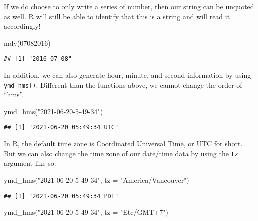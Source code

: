 \documentclass[
]{book}
\newenvironment{Shaded}{\begin{snugshade}}{\end{snugshade}}
\newcommand{\AttributeTok}[1]{\textcolor[rgb]{0.77,0.63,0.00}{#1}}
\newcommand{\DecValTok}[1]{\textcolor[rgb]{0.00,0.00,0.81}{#1}}
\newcommand{\FunctionTok}[1]{\textcolor[rgb]{0.00,0.00,0.00}{#1}}
\newcommand{\NormalTok}[1]{#1}
\newcommand{\StringTok}[1]{\textcolor[rgb]{0.31,0.60,0.02}{#1}}
\begin{document}
If we do choose to only write a series of number, then our string can be unquoted as well. R will still be able to identify that this is a string and will read it accordingly!

\begin{Shaded}
\begin{Highlighting}[]
\FunctionTok{mdy}\NormalTok{(}\DecValTok{07082016}\NormalTok{)}
\end{Highlighting}
\end{Shaded}

\begin{verbatim}
## [1] "2016-07-08"
\end{verbatim}

In addition, we can also generate hour, minute, and second information by using \texttt{ymd\_hms()}. Different than the functions above, we cannot change the order of ``hms''.

\begin{Shaded}
\begin{Highlighting}[]
\FunctionTok{ymd\_hms}\NormalTok{(}\StringTok{"2021{-}06{-}20{-}5{-}49{-}34"}\NormalTok{)}
\end{Highlighting}
\end{Shaded}

\begin{verbatim}
## [1] "2021-06-20 05:49:34 UTC"
\end{verbatim}

In R, the default time zone is Coordinated Universal Time, or UTC for short. But we can also change the time zone of our date/time data by using the \texttt{tz} argument like so:

\begin{Shaded}
\begin{Highlighting}[]
\FunctionTok{ymd\_hms}\NormalTok{(}\StringTok{"2021{-}06{-}20{-}5{-}49{-}34"}\NormalTok{, }\AttributeTok{tz =} \StringTok{"America/Vancouver"}\NormalTok{)}
\end{Highlighting}
\end{Shaded}

\begin{verbatim}
## [1] "2021-06-20 05:49:34 PDT"
\end{verbatim}

\begin{Shaded}
\begin{Highlighting}[]
\FunctionTok{ymd\_hms}\NormalTok{(}\StringTok{"2021{-}06{-}20{-}5{-}49{-}34"}\NormalTok{, }\AttributeTok{tz =} \StringTok{"Etc/GMT+7"}\NormalTok{)}
\end{Highlighting}
\end{Shaded}
\end{document}
